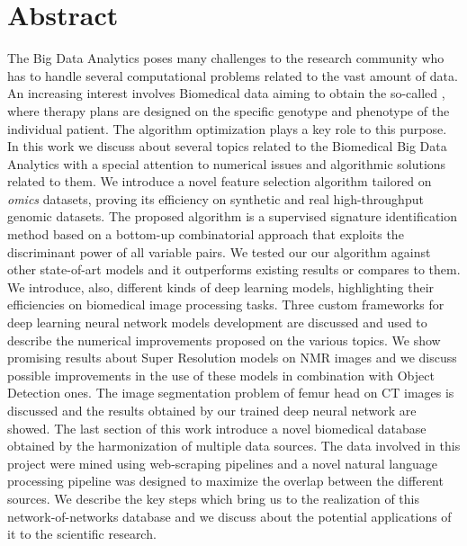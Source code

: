 \documentclass{standalone}
\begin{document}
\chapter*{Abstract}

The Big Data Analytics poses many challenges to the research community who has to handle several computational problems related to the vast amount of data.
An increasing interest involves Biomedical data aiming to obtain the so-called , where therapy plans are designed on the specific genotype and phenotype of the individual patient.
The algorithm optimization plays a key role to this purpose.
In this work we discuss about several topics related to the Biomedical Big Data Analytics with a special attention to numerical issues and algorithmic solutions related to them.
We introduce a novel feature selection algorithm tailored on \emph{omics} datasets, proving its efficiency on synthetic and real high-throughput genomic datasets.
The proposed algorithm is a supervised signature identification method based on a bottom-up combinatorial approach that exploits the discriminant power of all variable pairs.
We tested our our algorithm against other state-of-art models and it outperforms existing results or compares to them.
We introduce, also, different kinds of deep learning models, highlighting their efficiencies on biomedical image processing tasks.
Three custom frameworks for deep learning neural network models development are discussed and used to describe the numerical improvements proposed on the various topics.
We show promising results about Super Resolution models on NMR images and we discuss possible improvements in the use of these models in combination with Object Detection ones.
The image segmentation problem of femur head on CT images is discussed and the results obtained by our trained deep neural network are showed.
The last section of this work introduce a novel biomedical database obtained by the harmonization of multiple data sources.
The data involved in this project were mined using web-scraping pipelines and a novel natural language processing pipeline was designed to maximize the overlap between the different sources.
We describe the key steps which bring us to the realization of this network-of-networks database and we discuss about the potential applications of it to the scientific research.
\end{document}
